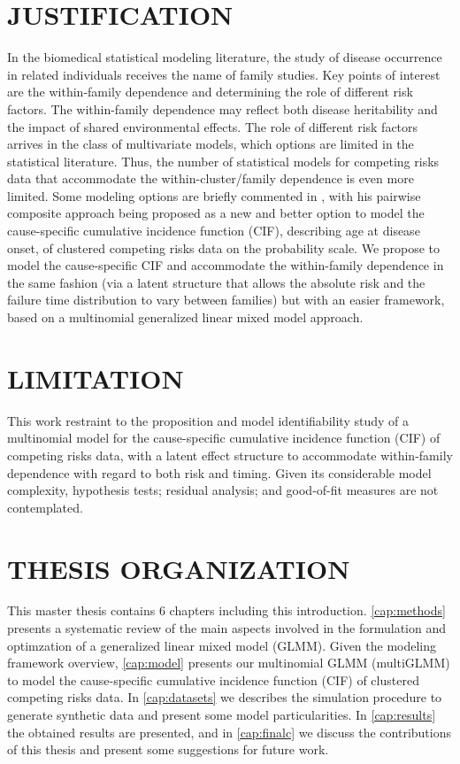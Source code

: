 \section{JUSTIFICATION}

In the biomedical statistical modeling literature, the study of disease
occurrence in related individuals receives the name of family studies.
Key points of interest are the within-family dependence and determining
the role of different risk factors. The within-family dependence may
reflect both disease heritability and the impact of shared environmental
effects. The role of different risk factors arrives in the class of
multivariate models, which options are limited in the statistical
literature. Thus, the number of statistical models for competing risks
data that accommodate the within-cluster/family dependence is even more
limited. Some modeling options are briefly commented in
, with his pairwise composite approach being
proposed as a new and better option to model the cause-specific
cumulative incidence function (CIF), describing age at disease onset, of
clustered competing risks data on the probability scale. We propose to
model the cause-specific CIF and accommodate the within-family
dependence in the same fashion (via a latent structure that allows the
absolute risk and the failure time distribution to vary between
families) but with an easier framework, based on a multinomial
generalized linear mixed model approach.

\section{LIMITATION}

This work restraint to the proposition and model identifiability study
of a multinomial model for the cause-specific cumulative incidence
function (CIF) of competing risks data, with a latent effect structure
to accommodate within-family dependence with regard to both risk and
timing. Given its considerable model complexity, hypothesis tests;
residual analysis; and good-of-fit measures are not contemplated.

\section{THESIS ORGANIZATION}

This master thesis contains 6 chapters including this introduction.
\autoref{cap:methods} presents a systematic review of the main aspects
involved in the formulation and optimzation of a generalized linear
mixed model (GLMM). Given the modeling framework overview,
\autoref{cap:model} presents our multinomial GLMM (multiGLMM) to model
the cause-specific cumulative incidence function (CIF) of clustered
competing risks data. In \autoref{cap:datasets} we describes the
simulation procedure to generate synthetic data and present some model
particularities. In \autoref{cap:results} the obtained results are
presented, and in \autoref{cap:finalc} we discuss the contributions of
this thesis and present some suggestions for future work.


